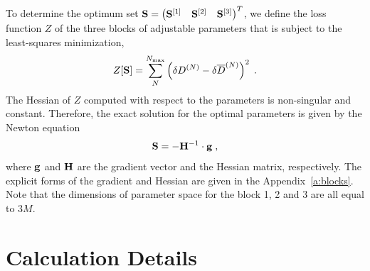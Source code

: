 \documentclass[aip,amsmath,amssymb,reprint,floatfix]{revtex4-1}
\begin{document}
To determine the optimum set 
$
 {\bf S} = 
\begin{pmatrix}
{\bf S}^{[1]} &
{\bf S}^{[2]} &
{\bf S}^{[3]}
\end{pmatrix}^T
$, we define the loss function $Z$ 
of the three blocks of adjustable parameters
that is subject to the least\hyp{}squares minimization,
%
\begin{equation}\label{e:Z}
 Z[{\bf S}] = \sum_N^{N_{\rm max}} \left( \delta D^{(N)} - \delta \overline{D}^{(N)} \right)^2 \;.
\end{equation}
%
The Hessian of $Z$ computed with respect to the parameters is non\hyp{}singular 
and constant.
Therefore, the exact solution for the optimal parameters is given by the Newton equation
%
\begin{equation}\label{e:Newton}
 {\bf S} = -{\bf H}^{-1} \cdot {\bf g} \;,
\end{equation}
%
where ${\bf g}$ and ${\bf H}$ are the gradient vector and the Hessian matrix, respectively.
%
%
The explicit forms of the gradient and Hessian are given in the Appendix~\ref{a:blocks}.
Note that the dimensions of parameter space for the block 1, 2 and 3 are all
equal to $3M$.

\section{\label{s:3}Calculation Details}
\end{document}
